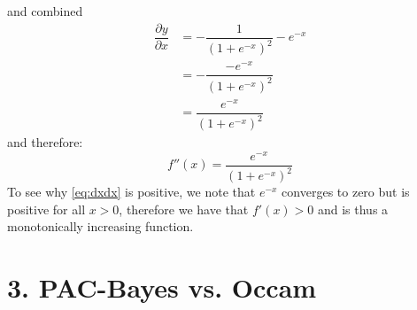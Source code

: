 \documentclass{article}
\begin{document}
and combined
\begin{align*}
\dfrac{\partial y}{\partial x} &= - \dfrac{1}{ (1+e^{-x})^2} -e^{-x} \\
&= - \dfrac{-e^{-x}}{(1+e^{-x})^2} \\
&= \dfrac{e^{-x}}{(1+e^{-x})^2}
\end{align*}
and therefore:
\begin{equation}
\label{eq:dxdx}
f''(x) = \dfrac{e^{-x}}{(1+e^{-x})^2}
\end{equation}
To see why \eqref{eq:dxdx} is positive, we note that $e^{-x}$ converges to zero but is positive for all $x > 0$, therefore we have that $f'(x)>0$ and is thus a monotonically increasing function.
\section{3. PAC-Bayes vs. Occam}
\end{document}
